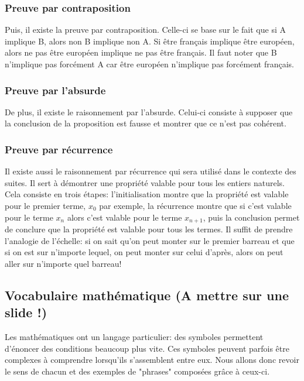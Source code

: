 \documentclass[a4paper, 12pt, french, twoside]{article}
\begin{document}
\subsubsection{Preuve par contraposition}
Puis, il existe la preuve par contraposition. Celle-ci se base sur le fait que si A implique B, alors non B implique non A. Si être français implique être européen, alors ne pas être européen implique ne pas être français. Il faut noter que B n'implique pas forcément A car être européen n'implique pas forcément français.


\subsubsection{Preuve par l'absurde}
De plus, il existe le raisonnement par l'absurde. Celui-ci consiste à supposer que la conclusion de la proposition est fausse et montrer que ce n'est pas cohérent.

\subsubsection{Preuve par récurrence}
Il existe aussi le raisonnement par récurrence qui sera utilisé dans le contexte des suites. Il sert à démontrer une propriété valable pour tous les entiers naturels. Cela consiste en trois étapes: l'initialisation montre que la propriété est valable pour le premier terme, $x_0$ par exemple, la récurrence montre que si c'est valable pour le terme $x_n$ alors c'est valable pour le terme $x_{n+1}$, puis la conclusion permet de conclure que la propriété est valable pour tous les termes. Il suffit de prendre l'analogie de l'échelle: si on sait qu'on peut monter sur le premier barreau et que si on est sur n'importe lequel, on peut monter sur celui d'après, alors on peut aller sur n'importe quel barreau! 

\subsection{Vocabulaire mathématique (A mettre sur une slide !)}

Les mathématiques ont un langage particulier: des symboles permettent d'énoncer des conditions beaucoup plus vite. Ces symboles peuvent parfois être complexes à comprendre lorsqu'ils s'assemblent entre eux. Nous allons donc revoir le sens de chacun et des exemples de "phrases" composées grâce à ceux-ci.
\end{document}
